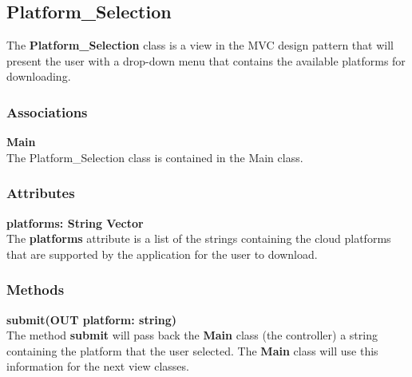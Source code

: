 \subsection{Platform\_Selection}
The \textbf{Platform\_Selection} class is a view in the MVC design pattern that will present
the user with a drop-down menu that contains the available platforms for downloading.

\subsubsection{Associations}
\textbf{Main} \\
The Platform\_Selection class is contained in the Main class.


\subsubsection{Attributes}
\textbf{platforms: String Vector} \\
The \textbf{platforms} attribute is a list of the strings containing the cloud platforms that
are supported by the application for the user to download.

\subsubsection{Methods}
\textbf{submit(OUT platform: string)} \\
The method \textbf{submit} will pass back the \textbf{Main} class (the controller) a string
containing the platform that the user selected. The \textbf{Main} class will use this information
for the next view classes.
  
